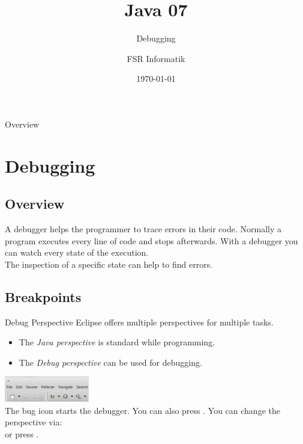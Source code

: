 

\title{Java 07}
\subtitle{Debugging}
\author{FSR Informatik}
\date{\today}



\begin{frame}
\titlepage
\end{frame}
\begin{frame}{Overview}
\tableofcontents
\end{frame}

\section{Debugging}
\subsection{Overview}
\begin{frame}{}
	A debugger helps the programmer to trace errors in their code.
	\vfill
	Normally a program executes every line of code and stops afterwards.
	With a debugger you can watch every state of the execution.\\
	
	The inspection of a specific state can help to find errors.
\end{frame}

\subsection{Breakpoints}
\begin{frame}{Debug Perspective}
	Eclipse offers multiple perspectives for multiple tasks.
	\begin{itemize}
		\item The \emph{Java perspective} is standard while programming.
		\item The \emph{Debug perspective} can be used for debugging.
	\end{itemize}
	\vfill
	\includegraphics[width=10em]{res/debug_start.png} \\
	The bug icon starts the debugger. You can also press .
	\vfill
	You can change the perspective via:
	 \\
	or press .
\end{frame}

